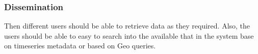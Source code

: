 \subsubsection{Dissemination}
Then different users should be able to retrieve data as they required. Also, the users should be able to easy to search into the available that in the system base on timeseries metadata or based on Geo queries.







